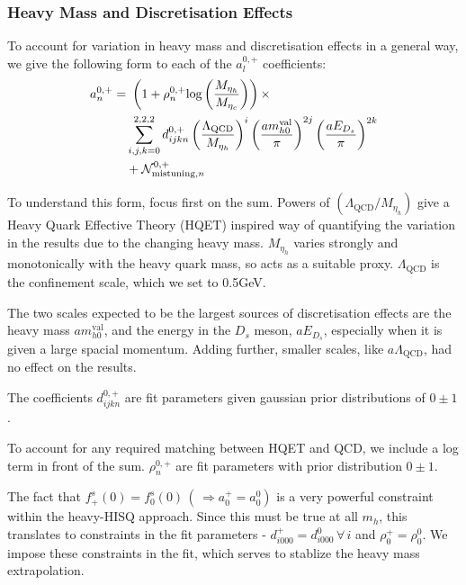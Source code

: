 \subsubsection{Heavy Mass and Discretisation Effects}

To account for variation in heavy mass and discretisation effects in a general way, we give the following form to each of the $a_l^{0,+}$ coefficients:
\begin{align}
  \nonumber  a_n^{0,+} = & \,\,\left( 1 + \rho^{0,+}_n \text{log}\left(M_{\eta_h}\over M_{\eta_c}\right)\right) \times \\ \nonumber
  &\sum_{i,j,k = 0}^{2,2,2} d^{0,+}_{ijkn} \left({\Lambda_{\text{QCD}}\over M_{\eta_h} }\right)^{i} \left({ am^{\text{val}}_{h0} \over \pi }\right)^{2j} \left({ aE_{D_s} \over \pi }\right)^{2k} \\ &+ \mathcal{N}_{\text{mistuning},n}^{0,+}
      \label{eq:mhfitfun}
\end{align}

To understand this form, focus first on the sum. Powers of $(\Lambda_{\text{QCD}}/M_{\eta_h})$ give a Heavy Quark Effective Theory (HQET) inspired way of quantifying the variation in the results due to the changing heavy mass. $M_{\eta_h}$ varies strongly and monotonically with the heavy quark mass, so acts as a suitable proxy. $\Lambda_{\text{QCD}}$ is the confinement scale, which we set to 0.5GeV.

The two scales expected to be the largest sources of discretisation effects are the heavy mass $am_{h0}^{\text{val}}$, and the energy in the $D_s$ meson, $aE_{D_s}$, especially when it is given a large spacial momentum. Adding further, smaller scales, like $a\Lambda_{\text{QCD}}$, had no effect on the results.

The coefficients $d^{0,+}_{ijkn}$ are fit parameters given gaussian prior distributions of $0\pm 1$.

To account for any required matching between HQET and QCD, we include a log term in front of the sum. $\rho^{0,+}_n$ are fit parameters with prior distribution $0\pm 1$.

The fact that $f^s_+(0) = f^s_0(0) \,(\,\Rightarrow a^+_0 = a^0_0)$ is a very powerful constraint within the heavy-HISQ approach. Since this must be true at all $m_h$, this translates to constraints in the fit parameters - $d^+_{i000}=d^0_{i000} \,\forall \,i$ and $\rho^+_0 = \rho^0_0$. We impose these constraints in the fit, which serves to stablize the heavy mass extrapolation.

